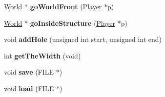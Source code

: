 \begin{DoxyCompactItemize}
\item 
\hypertarget{classWorld_a6c94d42ed4f963acaf902b9e0f0e6969}{}\hyperlink{classWorld}{World} $\ast$ {\bfseries go\+World\+Front} (\hyperlink{classPlayer}{Player} $\ast$p)\label{classWorld_a6c94d42ed4f963acaf902b9e0f0e6969}

\item 
\hypertarget{classWorld_ae8f0c71e69ef6f760cef8fc5b1b4f272}{}\hyperlink{classWorld}{World} $\ast$ {\bfseries go\+Inside\+Structure} (\hyperlink{classPlayer}{Player} $\ast$p)\label{classWorld_ae8f0c71e69ef6f760cef8fc5b1b4f272}

\item 
\hypertarget{classWorld_ab437e9250306323c6e931bb8658485cf}{}void {\bfseries add\+Hole} (unsigned int start, unsigned int end)\label{classWorld_ab437e9250306323c6e931bb8658485cf}

\item 
\hypertarget{classWorld_ab6979295419240f841da48903c7c554d}{}int {\bfseries get\+The\+Width} (void)\label{classWorld_ab6979295419240f841da48903c7c554d}

\item 
\hypertarget{classWorld_abdd6f140f62255b402d649616304fe09}{}void {\bfseries save} (F\+I\+L\+E $\ast$)\label{classWorld_abdd6f140f62255b402d649616304fe09}

\item 
\hypertarget{classWorld_a394c5b449ab36f75a0c6748ec2c34955}{}void {\bfseries load} (F\+I\+L\+E $\ast$)\label{classWorld_a394c5b449ab36f75a0c6748ec2c34955}

\end{DoxyCompactItemize}
